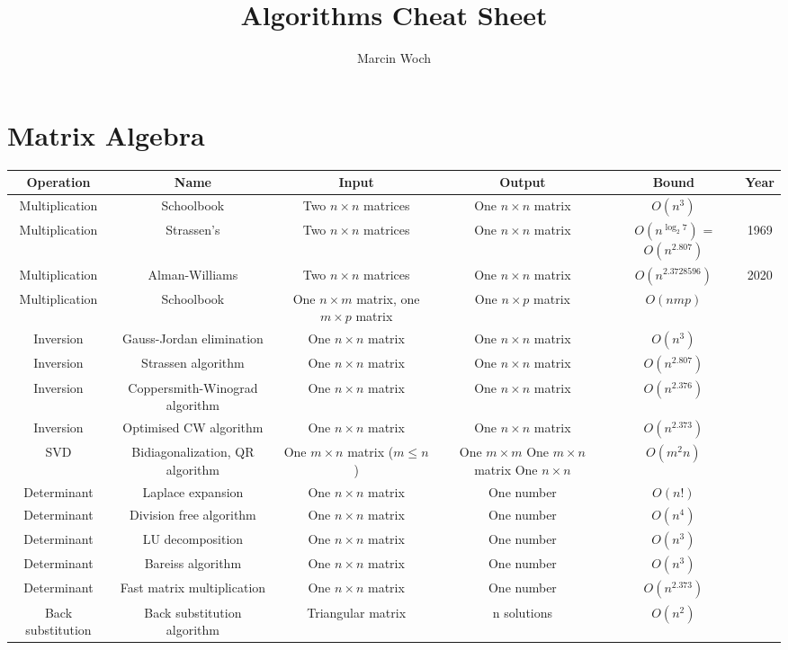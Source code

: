 \documentclass{article}
\author{Marcin Woch}
\title{Algorithms Cheat Sheet}
\date{}
\begin{document}
\maketitle

\newpage
\section*{Matrix Algebra}

\begin{table}[ht]
	\centering
	\begin{tabular}{c ccccc}
		Operation & Name & Input & Output & Bound & Year\\
		\hline
		Multiplication & Schoolbook & Two $n \times n$ matrices & One $n\times n$ matrix & $O(n^3)$ &\\
		Multiplication &Strassen's & Two $n \times n$  matrices & One $n\times n$ matrix &$O(n^{\log_2{7}})$ = $O(n^{2.807})$ & 1969\\
	    Multiplication &Alman-Williams & Two $n \times n$  matrices & One $n\times n$ matrix& $O(n^{2.3728596})$ & 2020\\
		Multiplication &Schoolbook & One $n\times m$ matrix, one $m\times p$ matrix & One $n\times p$ matrix& $O(nmp)$ & \\
		Inversion &Gauss-Jordan elimination & One $n\times n$ matrix & One $n\times n$ matrix& $O(n^3)$ & \\
		Inversion &Strassen algorithm & One $n\times n$ matrix & One $n\times n$ matrix& $O(n^{2.807})$ & \\
		Inversion &Coppersmith-Winograd algorithm & One $n\times n$ matrix & One $n\times n$ matrix& $O(n^{2.376})$ & \\
		Inversion &Optimised CW algorithm & One $n\times n$ matrix & One $n\times n$ matrix& $O(n^{2.373})$ & \\
		SVD &Bidiagonalization, QR algorithm & One $m\times n$ matrix ($m\leq n$)& \makecell {One $m\times m$ \\ One $m \times n$ matrix \\ One $n \times n$} & $O(m^2n)$ & \\
		Determinant &Laplace expansion & One $n\times n$ matrix & One number & $O(n!)$ & \\
		Determinant & Division free algorithm & One $n\times n$ matrix & One number & $O(n^4)$ & \\
		Determinant & LU decomposition & One $n\times n$ matrix & One number & $O(n^3)$ & \\
		Determinant & Bareiss algorithm & One $n\times n$ matrix & One number & $O(n^3)$ & \\
		Determinant & Fast matrix multiplication & One $n\times n$ matrix & One number & $O(n^{2.373})$ & \\
		Back substitution & Back substitution algorithm & Triangular matrix & n solutions & $O(n^2)$ & \\
		\hline
	\end{tabular}
\end{table}
\end{document}
